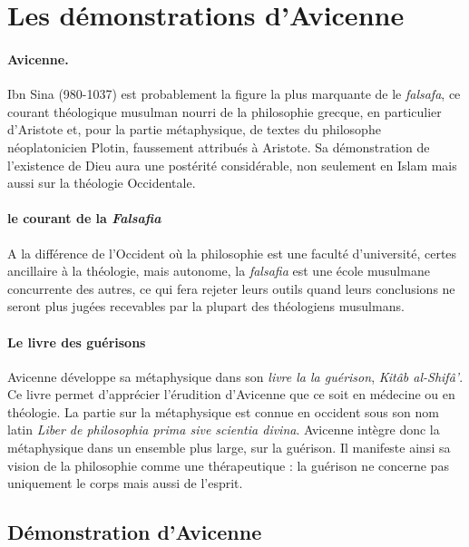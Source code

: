 \section{Les démonstrations d'Avicenne}

\paragraph{Avicenne.} Ibn Sina (980-1037) est probablement la figure la plus marquante de le \textit{falsafa}, ce courant théologique musulman nourri de la philosophie grecque, en particulier d'Aristote et, pour la partie métaphysique, de textes du philosophe néoplatonicien Plotin, faussement attribués à Aristote. 
Sa démonstration de l'existence de Dieu aura une postérité considérable, non seulement en Islam mais aussi sur la théologie Occidentale.

\paragraph{le courant de la \textit{Falsafia}} A la différence de l'Occident où la philosophie est une faculté d'université, certes ancillaire à la théologie, mais autonome, la \textit{falsafia} est une école musulmane concurrente des autres, ce qui fera rejeter leurs outils quand leurs conclusions ne seront plus jugées recevables par la plupart des théologiens musulmans.  

\paragraph{Le livre des guérisons}
    Avicenne développe sa métaphysique dans son  \textit{livre la la guérison}, \emph{Kitâb al-Shifâ'}. Ce livre permet d'apprécier l'érudition d'Avicenne que ce soit en médecine ou en théologie. La partie sur la métaphysique est connue en occident sous son nom latin \textit{Liber de philosophia prima sive scientia divina}.  Avicenne intègre donc la métaphysique dans un ensemble plus large, sur la guérison. Il manifeste ainsi sa vision de la philosophie comme une thérapeutique : la guérison ne concerne pas uniquement le corps mais aussi de l'esprit.


\subsection{Démonstration d'Avicenne}


